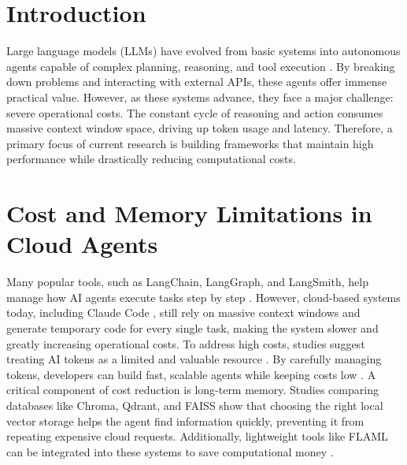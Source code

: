 \section{Introduction}
Large language models (LLMs) have evolved from basic systems into autonomous agents capable of complex planning, reasoning, and tool execution \cite{agent_survey, autogpt_p}. By breaking down problems and interacting with external APIs, these agents offer immense practical value. However, as these systems advance, they face a major challenge: severe operational costs. The constant cycle of reasoning and action consumes massive context window space, driving up token usage and latency. Therefore, a primary focus of current research is building frameworks that maintain high performance while drastically reducing computational costs.\\

\section{Cost and Memory Limitations in Cloud Agents}
Many popular tools, such as LangChain, LangGraph, and LangSmith, help manage how AI agents execute tasks step by step \cite{langchain_langgraph}. However, cloud-based systems today, including Claude Code \cite{claude_code_dive}, still rely on massive context windows and generate temporary code for every single task, making the system slower and greatly increasing operational costs. To address high costs, studies suggest treating AI tokens as a limited and valuable resource \cite{token_economics, ai_tokenomics, marginal_token}. By carefully managing tokens, developers can build fast, scalable agents while keeping costs low \cite{efficient_agents}. A critical component of cost reduction is long-term memory. Studies comparing databases like Chroma, Qdrant, and FAISS \cite{chroma_faiss_analysis} show that choosing the right local vector storage helps the agent find information quickly, preventing it from repeating expensive cloud requests. Additionally, lightweight tools like FLAML \cite{flaml} can be integrated into these systems to save computational money \cite{cost_aware_automl}.\\

